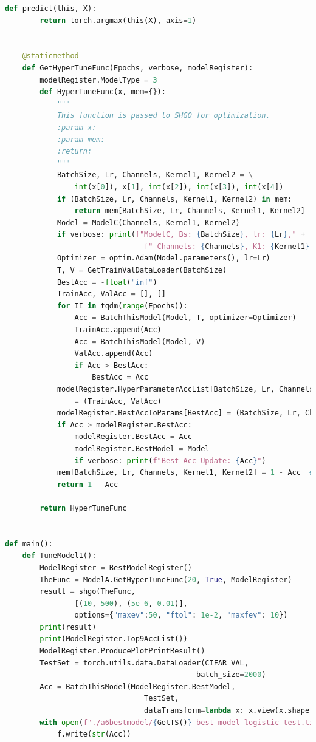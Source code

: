 \documentclass[]{article}
\begin{document}
\begin{lstlisting}[language=python]
    def predict(this, X):
        return torch.argmax(this(X), axis=1)


    @staticmethod
    def GetHyperTuneFunc(Epochs, verbose, modelRegister):
        modelRegister.ModelType = 3
        def HyperTuneFunc(x, mem={}):
            """
            This function is passed to SHGO for optimization.
            :param x:
            :param mem:
            :return:
            """
            BatchSize, Lr, Channels, Kernel1, Kernel2 = \
                int(x[0]), x[1], int(x[2]), int(x[3]), int(x[4])
            if (BatchSize, Lr, Channels, Kernel1, Kernel2) in mem:
                return mem[BatchSize, Lr, Channels, Kernel1, Kernel2]
            Model = ModelC(Channels, Kernel1, Kernel2)
            if verbose: print(f"ModelC, Bs: {BatchSize}, lr: {Lr}," +
                                f" Channels: {Channels}, K1: {Kernel1}, K2: {Kernel2}")
            Optimizer = optim.Adam(Model.parameters(), lr=Lr)
            T, V = GetTrainValDataLoader(BatchSize)
            BestAcc = -float("inf")
            TrainAcc, ValAcc = [], []
            for II in tqdm(range(Epochs)):
                Acc = BatchThisModel(Model, T, optimizer=Optimizer)
                TrainAcc.append(Acc)
                Acc = BatchThisModel(Model, V)
                ValAcc.append(Acc)
                if Acc > BestAcc:
                    BestAcc = Acc
            modelRegister.HyperParameterAccList[BatchSize, Lr, Channels, Kernel1, Kernel2] \
                = (TrainAcc, ValAcc)
            modelRegister.BestAccToParams[BestAcc] = (BatchSize, Lr, Channels, Kernel1, Kernel2)
            if Acc > modelRegister.BestAcc:
                modelRegister.BestAcc = Acc
                modelRegister.BestModel = Model
                if verbose: print(f"Best Acc Update: {Acc}")
            mem[BatchSize, Lr, Channels, Kernel1, Kernel2] = 1 - Acc  # Memeorization.
            return 1 - Acc

        return HyperTuneFunc


def main():
    def TuneModel1():
        ModelRegister = BestModelRegister()
        TheFunc = ModelA.GetHyperTuneFunc(20, True, ModelRegister)
        result = shgo(TheFunc,
                [(10, 500), (5e-6, 0.01)],
                options={"maxev":50, "ftol": 1e-2, "maxfev": 10})
        print(result)
        print(ModelRegister.Top9AccList())
        ModelRegister.ProducePlotPrintResult()
        TestSet = torch.utils.data.DataLoader(CIFAR_VAL,
                                            batch_size=2000)
        Acc = BatchThisModel(ModelRegister.BestModel,
                                TestSet,
                                dataTransform=lambda x: x.view(x.shape[0], -1))
        with open(f"./a6bestmodel/{GetTS()}-best-model-logistic-test.txt", "w+") as f:
            f.write(str(Acc))



\end{lstlisting}
\end{document}
